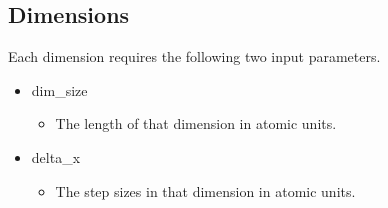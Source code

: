 \documentclass{article}
\begin{document}

\subsection{Dimensions} %
\label{sub:dimensions}
Each dimension requires the following two input parameters.
\begin{itemize}
  \item dim\_size
  \begin{itemize}
    \item The length of that dimension in atomic units.
  \end{itemize}
  \item delta\_x
  \begin{itemize}
    \item The step sizes in that dimension in atomic units.
  \end{itemize}
\end{itemize}
\end{document}

